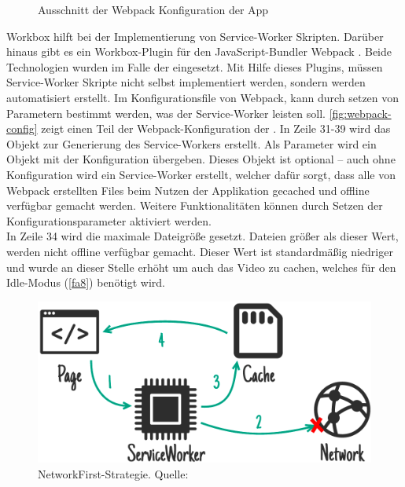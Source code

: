 \begin{figure}
  
  \caption{Ausschnitt der Webpack Konfiguration der \shst{} App}
  \label{fig:webpack-config}
\end{figure}

Workbox hilft bei der Implementierung von Service-Worker Skripten. Darüber hinaus gibt es ein 
Workbox-Plugin \cite{workbox-webpack-plugin} für den JavaScript-Bundler Webpack \cite{webpack}. 
Beide Technologien wurden im Falle der \shst{} eingesetzt. Mit Hilfe dieses Plugins, müssen 
Service-Worker Skripte nicht selbst implementiert werden, sondern werden automatisiert erstellt.
Im Konfigurationsfile von Webpack, kann durch setzen von Parametern bestimmt werden, was
der Service-Worker leisten soll. \autoref{fig:webpack-config} zeigt einen Teil der 
Webpack-Konfiguration der \shst{}. In Zeile 31-39 wird das Objekt zur Generierung des
Service-Workers erstellt. Als Parameter wird ein Objekt mit der Konfiguration übergeben. 
Dieses Objekt ist optional -- auch ohne Konfiguration wird ein Service-Worker erstellt,
welcher dafür sorgt, dass alle von Webpack erstellten Files beim Nutzen der Applikation
gecached und offline verfügbar gemacht werden. Weitere Funktionalitäten können durch
Setzen der Konfigurationsparameter aktiviert werden.\\
In Zeile 34 wird die maximale Dateigröße gesetzt. 
Dateien größer als dieser Wert, werden nicht offline verfügbar gemacht. Dieser Wert
ist standardmäßig niedriger und wurde an dieser Stelle erhöht um auch das Video zu cachen, welches
für den Idle-Modus (\ref{fa8}) benötigt wird.

\begin{figure}
    \centering
    \includegraphics[width=1\textwidth]{figures/images/ss-network-falling-back-to-cache.png}
    \caption{NetworkFirst-Strategie. Quelle: \cite{offline-cookbook}}
    \label{fig:network-first}
\end{figure}

